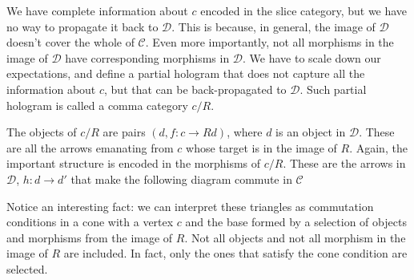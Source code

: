 \documentclass[11pt]{amsart}
\newcommand{\cat}[1]{\mathcal{#1}}
\begin{document}
We have complete information about $c$ encoded in the slice category, but we have no way to propagate it back to $\cat D$. This is because, in general, the image of $\cat D$ doesn't cover the whole of $\cat C$. Even more importantly, not all morphisms in the image of $\cat D$ have corresponding morphisms in $\cat D$. We have to scale down our expectations, and define a partial hologram that does not capture all the information about $c$, but that can be back-propagated to $\cat D$. Such partial hologram is called a comma category $c/R$.

The objects of $c/R$ are pairs $(d, f \colon c \to R d)$, where $d$ is an object in $\cat D$. These are all the arrows emanating from $c$ whose target is in the image of $R$. Again, the important structure is encoded in the morphisms of $c/R$. These are the arrows in $\cat D$, $h \colon d \to d'$ that make the following diagram commute in $\cat C$

\begin{figure}[H]
\centering
\end{figure}
Notice an interesting fact: we can interpret these triangles as commutation conditions in a cone with a vertex $c$ and the base formed by a selection of objects and morphisms from the image of $R$. Not all objects and not all morphism in the image of $R$ are included. In fact, only the ones that satisfy the cone condition are selected. 

\begin{figure}[H]
\end{figure}
\end{document}
